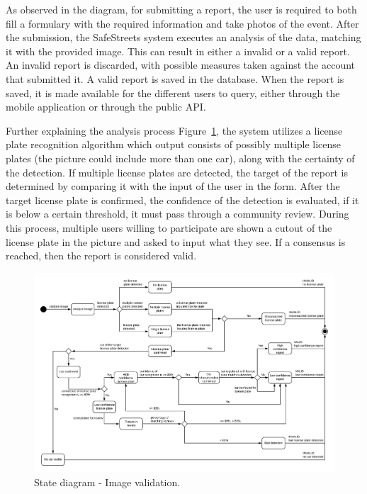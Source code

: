 As observed in the diagram, for submitting a report, the user is required to both fill a formulary with the required information and take photos of the event. After the submission, the SafeStreets system executes an analysis of the data, matching it with the provided image. This can result in either a invalid or a valid report. An invalid report is discarded, with possible measures taken against the account that submitted it. A valid report is saved in the database. When the report is saved, it is made available for the different users to query, either through the mobile application or through the public API.

Further explaining the analysis process Figure~\ref{fig:state-report-validation}, the system utilizes a license plate recognition algorithm which output consists of possibly multiple license plates (the picture could include more than one car), along with the certainty of the detection.
If multiple license plates are detected, the target of the report is determined by comparing it with the input of the user in the form.
After the target license plate is confirmed, the confidence of the detection is evaluated, if it is below a certain threshold, it must pass through a community review. During this process, multiple users willing to participate are shown a cutout of the license plate in the picture and asked to input what they see. If a consensus is reached, then the report is considered valid.

\begin{figure}[!h]
\centering
\includegraphics[width=\textwidth]{Images/state-image-validation.png}
\caption{\label{fig:state-report-validation}State diagram - Image validation.}
\end{figure}

